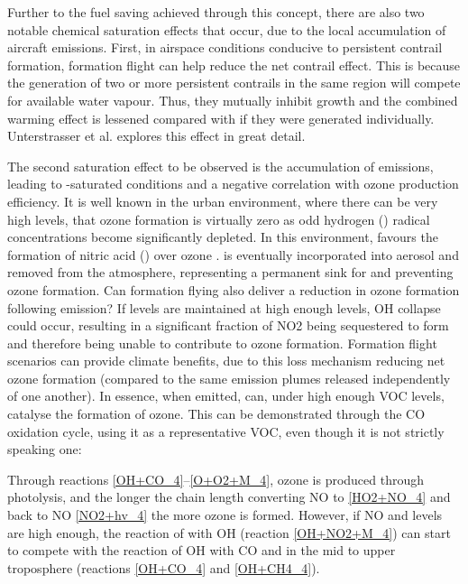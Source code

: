 Further to the fuel saving achieved through this concept, there are also two notable chemical saturation effects that occur, due to the local accumulation of aircraft emissions. First, in airspace conditions conducive to persistent contrail formation, formation flight can help reduce the net contrail effect. This is because the generation of two or more persistent contrails in the same region will compete for available water vapour. Thus, they mutually inhibit growth and the combined warming effect is lessened compared with if they were generated individually. Unterstrasser et al. \cite{Unterstrasser2020} explores this effect in great detail. 

The second saturation effect to be observed is the accumulation of  emissions, leading to -saturated conditions and a negative correlation with ozone production efficiency. It is well known in the urban environment, where there can be very high  levels, that ozone formation is virtually zero as odd hydrogen () radical concentrations become significantly depleted. In this environment,  favours the formation of nitric acid () over ozone \cite{Jenkin2002, Sillman2000}.  is eventually incorporated into aerosol and removed from the atmosphere, representing a permanent sink for  and preventing ozone formation. Can formation flying also deliver a reduction in ozone formation following  emission? If  levels are maintained at high enough levels, OH collapse could occur, resulting in a significant fraction of NO2 being sequestered to form  and therefore being unable to contribute to ozone formation. Formation flight scenarios can provide climate benefits, due to this  loss mechanism reducing net ozone formation (compared to the same emission plumes released independently of one another). In essence, when emitted,  can, under high enough VOC levels, catalyse the formation of ozone. This can be demonstrated through the CO oxidation cycle, using it as a representative VOC, even though it is not strictly speaking one:






Through reactions \eqref{OH+CO_4}--\eqref{O+O2+M_4}, ozone is produced through  photolysis, and the longer the chain length converting NO to  \eqref{HO2+NO_4} and back to NO \eqref{NO2+hv_4} the more ozone is formed. However, if NO and  levels are high enough, the reaction of  with OH (reaction \eqref{OH+NO2+M_4}) can start to compete with the reaction of OH with CO and  in the mid to upper troposphere (reactions \eqref{OH+CO_4} and \eqref{OH+CH4_4}).

